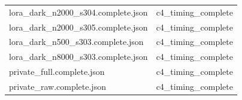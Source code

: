 \begin{longtable}{>{\raggedright\arraybackslash}p{.49\linewidth}>{\raggedright\arraybackslash}p{.44\linewidth}}
lora\_\allowbreak{}dark\_\allowbreak{}n2000\_\allowbreak{}s304.complete.json & %
c4\_\allowbreak{}timing\_\allowbreak{}complete \\ %

lora\_\allowbreak{}dark\_\allowbreak{}n2000\_\allowbreak{}s305.complete.json & %
c4\_\allowbreak{}timing\_\allowbreak{}complete \\ %

lora\_\allowbreak{}dark\_\allowbreak{}n500\_\allowbreak{}s303.complete.json & %
c4\_\allowbreak{}timing\_\allowbreak{}complete \\ %

lora\_\allowbreak{}dark\_\allowbreak{}n8000\_\allowbreak{}s303.complete.json & %
c4\_\allowbreak{}timing\_\allowbreak{}complete \\ %

private\_\allowbreak{}full.complete.json & %
c4\_\allowbreak{}timing\_\allowbreak{}complete \\ %

private\_\allowbreak{}raw.complete.json & %
c4\_\allowbreak{}timing\_\allowbreak{}complete \\ %


\end{longtable}
